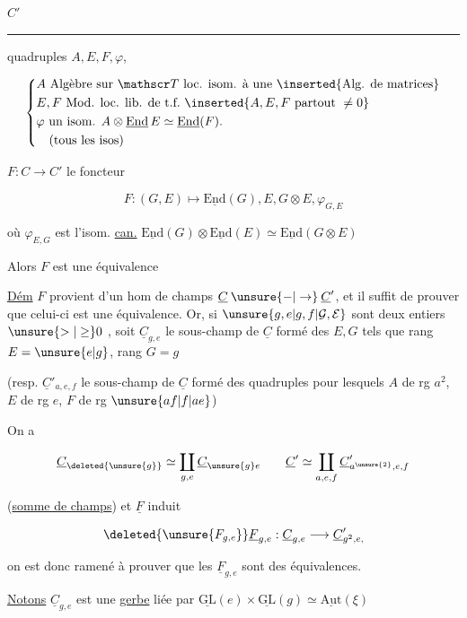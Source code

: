 
$C'$ \rule{3em}{.35pt} quadruples $A,E,F,\varphi$,

\[
\left\{\begin{aligned}
&A\ \text{Algèbre sur }\mathscr T\ \text{loc. isom. à une }\inserted{\text{Alg. de matrices}}\\
&E,F\ \text{Mod. loc. lib. de t.f.}\ \inserted{A,E,F\ \text{partout }\ne0}\\
&\varphi\ \text{un isom. } A\otimes\underline{\mathrm{End}}\,E\simeq\underline{\mathrm{End}}(F).\\
&\hspace{1em}(\text{tous les isos})
\end{aligned}\right.
\]

$F:C\longrightarrow C'$ le foncteur

\[
F:(G,E)\longmapsto\underline{\mathrm{End}}(G),E,G\otimes E,\varphi_{G,E}
\]

où $\varphi_{E,G}$ est l'isom. \uline{can.} $\underline{\mathrm{End}}(G)\otimes\underline{\mathrm{End}}(E)\simeq\underline{\mathrm{End}}(G\otimes E)$

Alors $F$ est une équivalence

\uline{Dém} $F$ provient d'un hom de champs $\underline C\mathbin{\unsure{-|\to}}\underline C'$, et il suffit
de prouver que celui-ci est une équivalence. Or, si $\unsure{g,e|g,f|\mathcal G,\mathcal E}$ sont
deux entiers $\unsure{>|\geq}0$ , soit $\underline C_{g,e}$ le sous-champ de $\underline C$ formé des $E,G$ tels
que rang $E=\unsure{e|g}$, rang $G=g$

(resp. $\underline C'_{a,e,f}$ le sous-champ de $\underline C$ formé des quadruples
pour lesquels $A$ de rg $a^2$, $E$ de rg $e$, $F$ de rg $\unsure{af|f|ae}$)

On a

\[
\underline C_{\deleted{\unsure{g}}}\simeq\coprod_{g,e}\underline C_{\unsure{g}e}\qquad
\underline C'\simeq\coprod_{a,e,f}\underline C'_{a^{\unsure{2}},e,f}
\]

(\uline{somme de champs}) et $\underline F$ induit

\[
\deleted{\unsure{F_{g,e}}}\underline F_{g,e}:\underline C_{g,e}\longrightarrow\underline C'_{g^{2},e,}
\]

on est donc ramené à prouver que les $\underline F_{g,e}$ sont des équivalences.

\uline{Notons} $\underline C_{g,e}$ est une \uline{gerbe}  liée par $\underline{\mathrm{GL}}(e)\times\underline{\mathrm{GL}}(g)\simeq\underline{\mathrm{Aut}}(\xi)$

